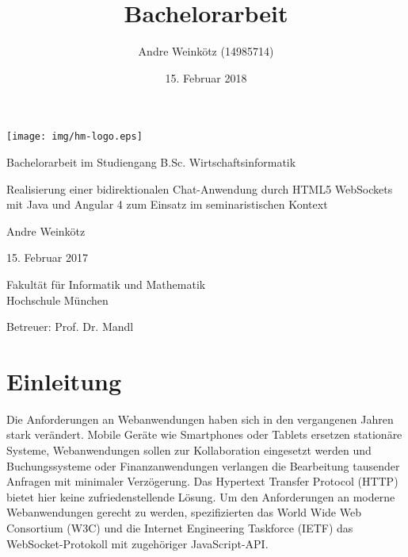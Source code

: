 \documentclass[11pt,a4paper,titlepage]{scrartcl}
\title{Bachelorarbeit}
\author{Andre Weinkötz (14985714)}
\date{15. Februar 2018}
\numberwithin{equation}{section}
\begin{document}
  \pagestyle{empty}

  \begin{titlepage}

\begin{center}
	\texttt{[image: img/hm-logo.eps]}
\end{center}
 \bigskip

 \begin{center} \large 
    
    Bachelorarbeit im Studiengang B.Sc. Wirtschaftsinformatik
    \vspace*{2.5cm}
\end{center}
    {\huge Realisierung einer bidirektionalen Chat-Anwendung durch HTML5 WebSockets mit Java und Angular 4 zum Einsatz im seminaristischen Kontext}
    
    \vspace*{2.0cm}
 \begin{center}
    Andre Weinkötz \bigskip
    
    

    15. Februar 2017
    \vspace*{2.5cm}
    
    

    Fakultät für Informatik und Mathematik \\
	Hochschule München\bigskip
	
	Betreuer: Prof. Dr. Mandl 
	
	
  \end{center}
\end{titlepage}


 \tableofcontents

\newpage
  \pagestyle{headings}

\section{Einleitung}
Die Anforderungen an Webanwendungen haben sich in den vergangenen Jahren stark verändert. Mobile Geräte wie Smartphones oder Tablets ersetzen stationäre Systeme, Webanwendungen sollen zur Kollaboration eingesetzt werden und Buchungssysteme oder Finanzanwendungen verlangen die Bearbeitung tausender Anfragen mit minimaler Verzögerung. Das Hypertext Transfer Protocol (HTTP) bietet hier keine zufriedenstellende Lösung. Um den Anforderungen an moderne Webanwendungen gerecht zu werden, spezifizierten das World Wide Web Consortium (W3C) und die Internet Engineering Taskforce (IETF) das WebSocket-Protokoll mit zugehöriger JavaScript-API. \\
\end{document}

